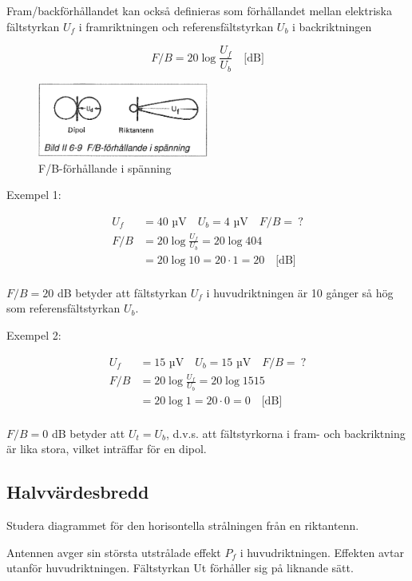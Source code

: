 Fram/backförhållandet kan också definieras som förhållandet mellan
elektriska fältstyrkan \(U_f\) i framriktningen och
referensfältstyrkan \(U_b\) i backriktningen

\[ F/B = 20 \log\frac{U_f}{U_b} \quad \text{[dB]} \]

\begin{figure}
  \includegraphics[width=0.5\textwidth]{images/bild_2_6-09}
  \caption{F/B-förhållande i spänning}
  \label{fig:bildII6-9}
\end{figure}

Exempel 1:

\begin{align*}
  U_f &= 40 \text{ µV} \quad U_b = 4\text{ µV} \quad F/B =\ ? \\
  F/B &= 20 \log\frac{U_f}{U_b} = 20 \log{40}{4} \\
  &= 20 \log 10 = 20 \cdot 1 = 20 \quad \text{[dB]} \\
\end{align*}

\(F/B = 20\) dB betyder att fältstyrkan \(U_f\) i huvudriktningen är
10 gånger så hög som referensfältstyrkan \(U_b\).

Exempel 2:

\begin{align*}
  U_f &= 15 \text{ µV} \quad U_b = 15\text{ µV} \quad F/B =\ ? \\
  F/B &= 20 \log\frac{U_f}{U_b} = 20 \log{15}{15} \\
  &= 20 \log 1 = 20 \cdot 0 = 0 \quad \text{[dB]} \\
\end{align*}

\(F/B = 0\) dB betyder att \(U_t = U_b\), d.v.s. att fältstyrkorna i
fram- och backriktning är lika stora, vilket inträffar för en dipol.

\subsection{Halvvärdesbredd}
Studera diagrammet för den horisontella strålningen från en
riktantenn.

Antennen avger sin största utstrålade effekt \(P_f\) i
huvudriktningen.  Effekten avtar utanför huvudriktningen.  Fältstyrkan
Ut förhåller sig på liknande sätt.


